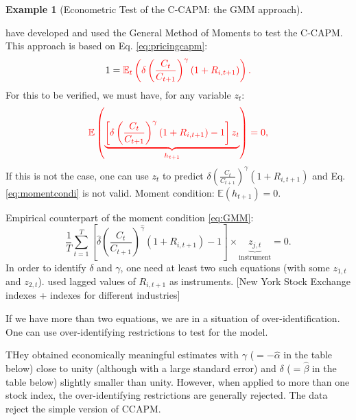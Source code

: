 \documentclass[
  12pt,
]{book}
\theoremstyle{definition}
\theoremstyle{definition}
\newtheorem{example}{Example}[chapter]
\theoremstyle{definition}
\theoremstyle{definition}
\theoremstyle{remark}
\begin{document}
\begin{example}[Econometric Test of the C-CAPM: the GMM approach]
\protect\hypertarget{exm:GMM}{}\label{exm:GMM}

\citet{Hansen_Singleton_1982} have developed and used the General Method of Moments to test the C-CAPM. This approach is based on Eq. \eqref{eq:pricingcapm}:
\begin{equation}
1 = \color{red}{\mathbb{E}_t}\left( \delta \left(\frac{C_t}{C_{t+1}}\right)^\gamma (1+R_{i,t+1})\right).\label{eq:momentcondi}
\end{equation}
For this to be verified, we must have, for any variable \(z_t\):
\begin{equation}
\color{red}{\mathbb{E}}\left( \underbrace{\left[\delta \left(\frac{C_t}{C_{t+1}}\right)^\gamma (1+R_{i,t+1}) - 1\right] z_t}_{h_{t+1}}\right) = 0,\label{eq:GMM}
\end{equation}
If this is not the case, one can use \(z_t\) to predict \(\delta \left(\frac{C_t}{C_{t+1}}\right)^\gamma (1+R_{i,t+1})\) and Eq. \eqref{eq:momentcondi} is not valid. Moment condition: \(\mathbb{E}(h_{t+1})=0\).

Empirical counterpart of the moment condition \eqref{eq:GMM}:
\begin{equation}
\frac{1}{T}\sum_{t=1}^{T} \left[\hat\delta \left(\frac{C_t}{C_{t+1}}\right)^{\hat\gamma} (1+R_{i,t+1}) - 1\right] \times\underbrace{z_{j,t}}_{\mbox{instrument}} = 0.
\end{equation}
In order to identify \(\delta\) and \(\gamma\), one need at least two such equations (with some \(z_{1,t}\) and \(z_{2,t}\)). \citet{Hansen_Singleton_1982} used lagged values of \(R_{i,t+1}\) as instruments. {[}New York Stock Exchange indexes + indexes for different industries{]}

If we have more than two equations, we are in a situation of over-identification. One can use over-identifying restrictions to test for the model.

THey obtained economically meaningful estimates with \(\gamma\) (\(=-\hat\alpha\) in the table below) close to unity (although with a large standard error) and \(\delta\) (\(=\hat\beta\) in the table below) slightly smaller than unity. However, when applied to more than one stock index, the over-identifying restrictions are generally rejected. The data reject the simple version of CCAPM.

\begin{figure}


\end{figure}
\end{example}
\end{document}
